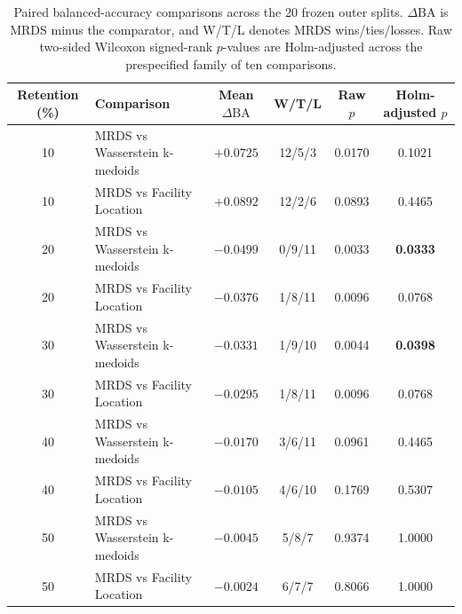 \begin{table}[t]
\centering
\caption{Paired balanced-accuracy comparisons across the 20 frozen outer
splits. $\Delta\mathrm{BA}$ is MRDS minus the comparator, and W/T/L denotes
MRDS wins/ties/losses. Raw two-sided Wilcoxon signed-rank $p$-values are
Holm-adjusted across the prespecified family of ten comparisons.}
\small
\begin{tabular*}{\textwidth}{@{\extracolsep{\fill}}clcccc@{}}
\toprule
Retention (\%) & Comparison & Mean $\Delta\mathrm{BA}$ & W/T/L & Raw $p$ & Holm-adjusted $p$ \\
\midrule
10 & MRDS vs Wasserstein k-medoids & $+0.0725$ & 12/5/3 & 0.0170 & 0.1021 \\
10 & MRDS vs Facility Location & $+0.0892$ & 12/2/6 & 0.0893 & 0.4465 \\
20 & MRDS vs Wasserstein k-medoids & $-0.0499$ & 0/9/11 & 0.0033 & \textbf{0.0333} \\
20 & MRDS vs Facility Location & $-0.0376$ & 1/8/11 & 0.0096 & 0.0768 \\
30 & MRDS vs Wasserstein k-medoids & $-0.0331$ & 1/9/10 & 0.0044 & \textbf{0.0398} \\
30 & MRDS vs Facility Location & $-0.0295$ & 1/8/11 & 0.0096 & 0.0768 \\
40 & MRDS vs Wasserstein k-medoids & $-0.0170$ & 3/6/11 & 0.0961 & 0.4465 \\
40 & MRDS vs Facility Location & $-0.0105$ & 4/6/10 & 0.1769 & 0.5307 \\
50 & MRDS vs Wasserstein k-medoids & $-0.0045$ & 5/8/7 & 0.9374 & 1.0000 \\
50 & MRDS vs Facility Location & $-0.0024$ & 6/7/7 & 0.8066 & 1.0000 \\
\bottomrule
\end{tabular*}
\end{table}
